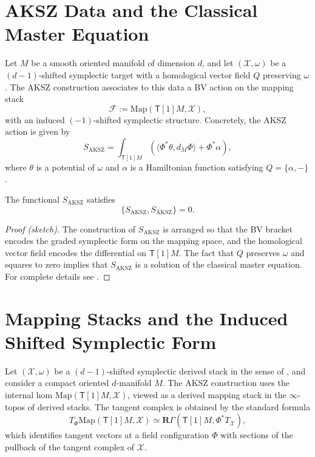 \section{AKSZ Data and the Classical Master Equation}

Let $M$ be a smooth oriented manifold of dimension $d$,
and let $(\mathcal{X},\omega)$ be a $(d-1)$-shifted symplectic target
with a homological vector field $Q$ preserving $\omega$.
The AKSZ construction associates to this data a BV action on the
mapping stack
\[
\mathcal{F} := \mathrm{Map}(\mathsf{T}[1]M,\mathcal{X}),
\]
with an induced $(-1)$-shifted symplectic structure.
Concretely, the AKSZ action is given by
\begin{equation}
S_{\mathrm{AKSZ}} = \int_{\mathsf{T}[1]M}
\left( \langle \Phi^{\ast}\theta, d_M \Phi\rangle
    + \Phi^{\ast}\alpha \right),
\label{eq:AKSZ-action}
\end{equation}
where $\theta$ is a potential of $\omega$ and $\alpha$ is a Hamiltonian
function satisfying $Q=\{\alpha,-\}$.

\begin{theorem}
The functional $S_{\mathrm{AKSZ}}$ satisfies
\[
\{S_{\mathrm{AKSZ}},S_{\mathrm{AKSZ}}\}=0.
\]
\end{theorem}

\begin{proof}[Proof (sketch)]
The construction of $S_{\mathrm{AKSZ}}$ is arranged so that
the BV bracket encodes the graded symplectic form on the mapping space,
and the homological vector field encodes the differential on
$\mathsf{T}[1]M$.
The fact that $Q$ preserves $\omega$ and squares to zero implies
that $S_{\mathrm{AKSZ}}$ is a solution of the classical master equation.
For complete details see \cite{AKSZ97,CF01,CF07,PTVV13}.
\end{proof}

\section{Mapping Stacks and the Induced Shifted Symplectic Form}

Let $(\mathcal{X},\omega)$ be a $(d-1)$-shifted symplectic derived stack
in the sense of \cite{PTVV13}, and consider a compact oriented
$d$-manifold $M$. The AKSZ construction uses the internal hom
$\mathrm{Map}(\mathsf{T}[1]M,\mathcal{X})$, viewed as a derived mapping
stack in the $\infty$-topos of derived stacks. The tangent complex
is obtained by the standard formula
\[
T_{\Phi}\mathrm{Map}(\mathsf{T}[1]M,\mathcal{X})
\simeq \mathbf{R}\Gamma(\mathsf{T}[1]M, \Phi^{\ast}T_{\mathcal{X}}),
\]
which identifies tangent vectors at a field configuration $\Phi$
with sections of the pullback of the tangent complex of $\mathcal{X}$.


